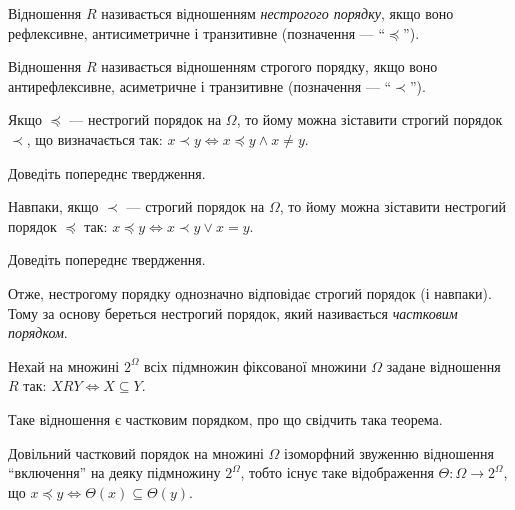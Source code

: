 \begin{definition}
	Відношення $R$ називається відношенням \textit{нестрогого порядку}, якщо воно рефлексивне, антисиметричне і транзитивне (позначення --- ``$\preceq$'').
\end{definition}

\begin{definition}
	Відношення $R$ називається відношенням строгого порядку, якщо воно антирефлексивне, асиметричне і транзитивне (позначення --- ``$\prec$'').
\end{definition}

\begin{proposition}
	Якщо $\preceq$ --- нестрогий порядок на $\Omega$, то йому можна зіставити строгий порядок $\prec$, що визначається так: $x \prec y \iff x \preceq y \land x \ne y$. 
\end{proposition}

\begin{exercise}
	Доведіть попереднє твердження.
\end{exercise}

\begin{proposition}
	Навпаки, якщо $\prec$ --- строгий порядок на $\Omega$, то йому можна зіставити нестрогий порядок $\preceq$ так: $x \preceq y \iff x \prec y \lor x = y$.
\end{proposition}

\begin{exercise}
	Доведіть попереднє твердження.
\end{exercise}

\begin{remark}
	Отже, нестрогому порядку однозначно відповідає строгий порядок (і навпаки). Тому за основу береться нестрогий порядок, який називається \textit{частковим порядком}.
\end{remark}

\begin{definition}
	Нехай на множині $2^\Omega$ всіх підмножин фіксованої множини $\Omega$ задане відношення $R$ так: $X R Y \iff X \subseteq Y$. 
\end{definition}

Таке відношення є частковим порядком, про що свідчить така теорема.

\begin{theorem}
	Довільний частковий порядок на множині $\Omega$ ізоморфний звуженню відношення ``включення'' на деяку підмножину $2^\Omega$, тобто існує таке відображення $\Theta: \Omega \to 2^\Omega$, що $x \preceq y \iff \Theta(x) \subseteq \Theta(y)$.
\end{theorem}

